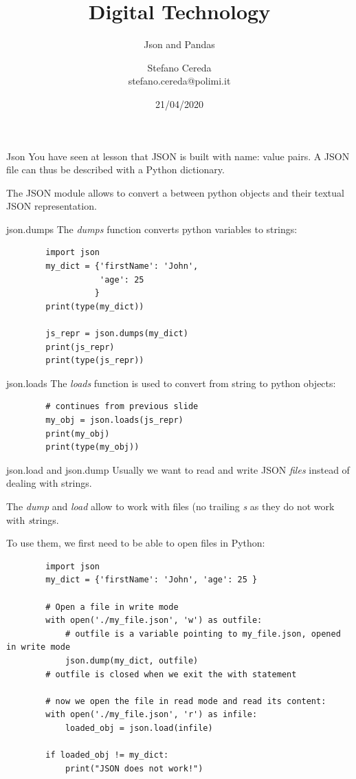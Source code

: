 \documentclass[aspectratio=169,handout]{beamer}
\title{Digital Technology}
\subtitle{Json and Pandas}
\author{Stefano Cereda\\
stefano.cereda@polimi.it
}
\date{21/04/2020}
\institute[PoliMi]{Politecnico Milano}
\begin{document}
\begin{frame}
    \maketitle
\end{frame}

\begin{frame}{Json}
    You have seen at lesson that JSON is built with name: value pairs.
    A JSON file can thus be described with a Python dictionary.

    The JSON module allows to convert a between python objects and their textual JSON representation.
\end{frame}

\begin{frame}[fragile]{json.dumps}
    The \emph{dumps} function converts python variables to strings:
    \begin{verbatim}
        import json
        my_dict = {'firstName': 'John',
                   'age': 25
                  }
        print(type(my_dict))

        js_repr = json.dumps(my_dict)
        print(js_repr)
        print(type(js_repr))
    \end{verbatim}
\end{frame}

\begin{frame}[fragile]{json.loads}
    The \emph{loads} function is used to convert from string to python objects:
    \begin{verbatim}
        # continues from previous slide
        my_obj = json.loads(js_repr)
        print(my_obj)
        print(type(my_obj))
    \end{verbatim}
\end{frame}


\begin{frame}[fragile]{json.load and json.dump}
    Usually we want to read and write JSON \emph{files} instead of dealing with strings.

    The \emph{dump} and \emph{load} allow to work with files (no trailing \emph{s} as they do not work with
    \emph{s}trings.

    To use them, we first need to be able to open files in Python:
    \begin{verbatim}
        import json
        my_dict = {'firstName': 'John', 'age': 25 }

        # Open a file in write mode
        with open('./my_file.json', 'w') as outfile:
            # outfile is a variable pointing to my_file.json, opened in write mode
            json.dump(my_dict, outfile)
        # outfile is closed when we exit the with statement

        # now we open the file in read mode and read its content:
        with open('./my_file.json', 'r') as infile:
            loaded_obj = json.load(infile)

        if loaded_obj != my_dict:
            print("JSON does not work!")
    \end{verbatim}
\end{frame}
\end{document}
